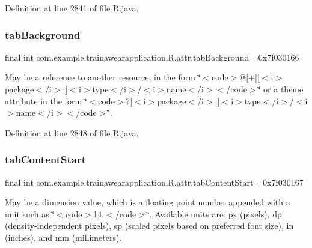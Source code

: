 Definition at line 2841 of file R.\+java.

\mbox{\label{classcom_1_1example_1_1trainawearapplication_1_1_r_1_1attr_a9ceb5a38bfae7a63171b32f79e0be7a3}} 
\subsubsection{\texorpdfstring{tabBackground}{tabBackground}}
{\footnotesize\ttfamily final int com.\+example.\+trainawearapplication.\+R.\+attr.\+tab\+Background =0x7f030166\hspace{0.3cm}{\ttfamily [static]}}

May be a reference to another resource, in the form \char`\"{}$<$code$>$@\mbox{[}+\mbox{]}\mbox{[}$<$i$>$package$<$/i$>$\+:\mbox{]}$<$i$>$type$<$/i$>$/$<$i$>$name$<$/i$>$$<$/code$>$\char`\"{} or a theme attribute in the form \char`\"{}$<$code$>$?\mbox{[}$<$i$>$package$<$/i$>$\+:\mbox{]}$<$i$>$type$<$/i$>$/$<$i$>$name$<$/i$>$$<$/code$>$\char`\"{}. 

Definition at line 2848 of file R.\+java.

\mbox{\label{classcom_1_1example_1_1trainawearapplication_1_1_r_1_1attr_a421d4eaaa9accf369340006562707879}} 
\subsubsection{\texorpdfstring{tabContentStart}{tabContentStart}}
{\footnotesize\ttfamily final int com.\+example.\+trainawearapplication.\+R.\+attr.\+tab\+Content\+Start =0x7f030167\hspace{0.3cm}{\ttfamily [static]}}

May be a dimension value, which is a floating point number appended with a unit such as \char`\"{}$<$code$>$14.\+5sp$<$/code$>$\char`\"{}. Available units are\+: px (pixels), dp (density-\/independent pixels), sp (scaled pixels based on preferred font size), in (inches), and mm (millimeters). 

